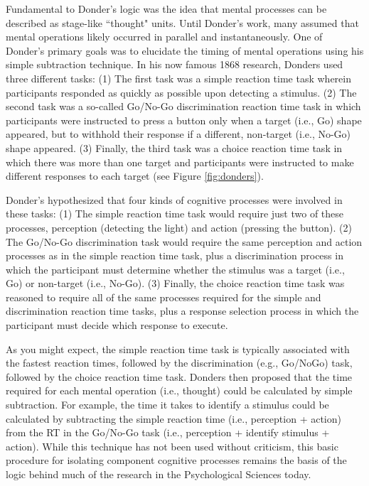Fundamental to Donder's logic was the idea that mental processes can be described as stage-like ``thought" units. Until Donder's work, many assumed that mental operations likely occurred in parallel and instantaneously. One of Donder's primary goals was to elucidate the timing of mental operations using his simple subtraction technique. In his now famous 1868 research, Donders used three different tasks: (1) The first task was a simple reaction time task wherein participants responded as quickly as possible upon detecting a stimulus. (2) The second task was a so-called Go/No-Go discrimination reaction time task in which participants were instructed to press a button only when a target (i.e., Go) shape appeared, but to withhold their response if a different, non-target (i.e., No-Go) shape appeared. (3) Finally, the third task was a choice reaction time task in which there was more than one target and participants were instructed to make different responses to each target (see Figure \ref{fig:donders}).
\begin{center}
\end{center}

Donder’s hypothesized that four kinds of cognitive processes were involved in these tasks: (1) The simple reaction time task would require just two of these processes, perception (detecting the light) and action (pressing the button). (2) The Go/No-Go discrimination task would require the same perception and action processes as in the simple reaction time task, plus a discrimination process in which the participant must determine whether the stimulus was a target (i.e., Go) or non-target (i.e., No-Go). (3) Finally, the choice reaction time task was reasoned to require all of the same processes required for the simple and discrimination reaction time tasks, plus a response selection process in which the participant must decide which response to execute. 

As you might expect, the simple reaction time task is typically associated with the fastest reaction times, followed by the discrimination (e.g., Go/NoGo) task, followed by the choice reaction time task. Donders then proposed that the time required for each mental operation (i.e., thought) could be calculated by simple subtraction. For example, the time it takes to identify a stimulus could be calculated by subtracting the simple reaction time (i.e., perception + action) from the RT in the Go/No-Go task (i.e., perception + identify stimulus + action). While this technique has not been used without criticism, this basic procedure for isolating component cognitive processes remains the basis of the logic behind much of the research in the Psychological Sciences today.

